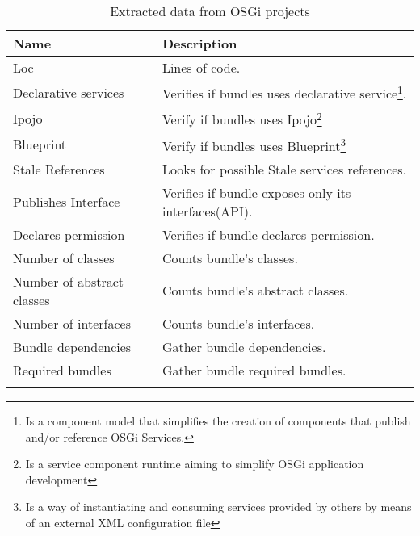 \begin{table}[h]
\caption{Extracted data from OSGi projects}
\label{extracted-data}
\begin{center}
    \begin{tabular}{  p{4cm} | p{8cm} }
    \Xhline{2\arrayrulewidth}
    Name & Description\\  \hline
    Loc & Lines of code.\\ \hline
    Declarative services & Verifies if bundles uses declarative service\footnote{Is a component model that simplifies the creation of components that publish and/or reference OSGi Services.}.\\ \hline
    Ipojo & Verify if bundles uses Ipojo\footnote{Is a service component runtime aiming to simplify OSGi application development} \\ \hline
    Blueprint & Verify if bundles uses Blueprint\footnote{Is a way of instantiating and consuming services provided by others by means of an external XML configuration file} \\ \hline
    Stale References & Looks for possible Stale services references.\\ \hline
    Publishes Interface & Verifies if bundle exposes only its interfaces(API).\\ \hline
    Declares permission & Verifies if bundle declares permission.\\ \hline
    Number of classes & Counts bundle's classes.\\ \hline
    Number of abstract classes & Counts bundle's abstract classes.\\ \hline
    Number of interfaces & Counts bundle's interfaces.\\ \hline
    Bundle dependencies & Gather bundle dependencies.\\ \hline
    Required bundles & Gather bundle required bundles.\\ \Xhline{2\arrayrulewidth}
    \end{tabular}
\end{center}
\end{table}
\FloatBarrier 

